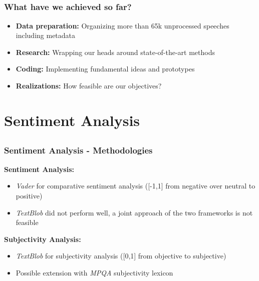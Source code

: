 \documentclass{beamer}
\begin{document}
	\subsection{}
	\begin{framefont}{\footnotesize}
		\begin{frame}
			\frametitle{What have we achieved so far?}
			\begin{itemize}
				\setlength\itemsep{1.2em}
				\item \textbf{Data preparation:} Organizing more than 65k unprocessed speeches including metadata
				\item \textbf{Research:} Wrapping our heads around state-of-the-art methods
				\item \textbf{Coding:} Implementing fundamental ideas and prototypes
				\item \textbf{Realizations:} How feasible are our objectives? 
			\end{itemize}
		\end{frame}
	\end{framefont}
	
	

	
	

\section{Sentiment Analysis}	



\subsection{}
\begin{framefont}{\footnotesize}
	\begin{frame}
		\frametitle{Sentiment Analysis - Methodologies}


	
		\textbf{Sentiment Analysis:}
		\begin{itemize}
			\setlength\itemsep{0.8em}
			\item \textit{Vader} for comparative sentiment analysis ([-1,1] from negative over neutral to positive)
			\item \textit{TextBlob} did not perform well, a joint approach of the two frameworks is not feasible
		\end{itemize}
			
		
		\textbf{Subjectivity Analysis:}	 
        \begin{itemize}
        \item \textit{TextBlob} for subjectivity analysis ([0,1] from objective to subjective)
        \item Possible extension with \textit{MPQA} subjectivity lexicon \citep{mpqa}
		\end{itemize}
		
	
	\end{frame}
\end{framefont}
\end{document}
